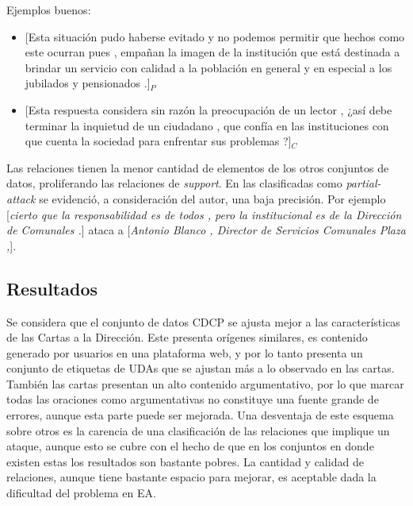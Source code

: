 Ejemplos buenos:
\begin{itemize}
	\item \text{} [Esta situación pudo haberse evitado y no podemos permitir que hechos como este ocurran pues , 
	empañan la imagen de la institución que está destinada a brindar un servicio con calidad a la población en 
	general y en especial a los jubilados y pensionados .]$_P$ %
	\item \text{} [Esta respuesta considera sin razón la preocupación de un lector , 
	¿así debe terminar la inquietud de un ciudadano , que confía en las instituciones con que cuenta la 
	sociedad para enfrentar sus problemas ?]$_C$ %
\end{itemize}

Las relaciones tienen la menor cantidad de elementos de los otros conjuntos de datos, proliferando
las relaciones de \emph{support}. En las clasificadas como \emph{partial-attack} se evidenció, a 
consideración del autor, una baja precisión. Por ejemplo 
[\emph{cierto que la responsabilidad es de todos , pero la institucional es de la Dirección de Comunales .}]
ataca a [\emph{Antonio Blanco , Director de Servicios Comunales Plaza ,}].

\subsection{Resultados}

Se considera que el conjunto de datos CDCP se ajusta mejor a las características de las Cartas 
a la Dirección. Este presenta orígenes similares, es contenido generado por usuarios en una plataforma
web, y por lo tanto presenta un conjunto de etiquetas de UDAs que se ajustan más a lo observado 
en las cartas. También las cartas presentan un alto contenido argumentativo, por lo que marcar 
todas las oraciones como argumentativas no constituye una fuente grande de errores, aunque esta 
parte puede ser mejorada. Una desventaja de este esquema sobre otros es la carencia de una 
clasificación de las relaciones que implique un ataque, aunque esto se cubre con el hecho de 
que en los conjuntos en donde existen estas los resultados son bastante pobres. La cantidad 
y calidad de relaciones, aunque tiene bastante espacio para mejorar, es aceptable dada la dificultad 
del problema en EA.

